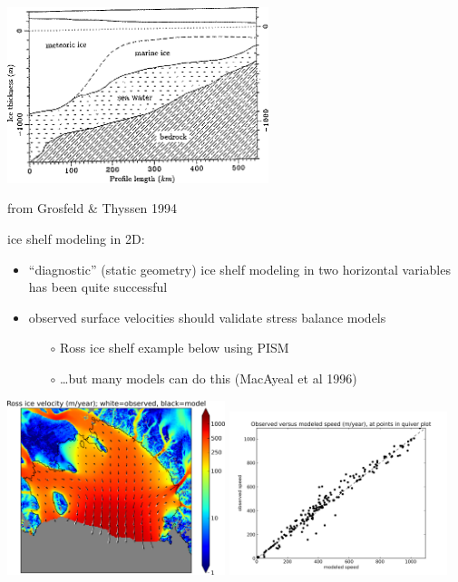 \documentclass[titlepage,letterpaper,final,12pt]{scrartcl}
\begin{document}
\medskip
\begin{center}
  \includegraphics[width=3.0in]{marineice}
  
from Grosfeld \& Thyssen 1994 \nocite{GrosfeldThyssen1994}
\end{center}

ice shelf modeling in 2D:

\begin{itemize}
\item ``diagnostic'' (static geometry) ice shelf modeling in two horizontal variables has been quite successful
\item observed surface velocities should validate stress balance models
  \begin{itemize}
  \item[$\circ$] Ross ice shelf example below using PISM
  \item[$\circ$] \dots but many models can do this (MacAyeal et al 1996\nocite{MacAyealetal})
  \end{itemize}
\end{itemize}

\begin{center}
  \includegraphics[width=2.5in]{rossquiver}
  \quad
  \includegraphics[width=2.5in]{rossscatter}
\end{center}
\end{document}

